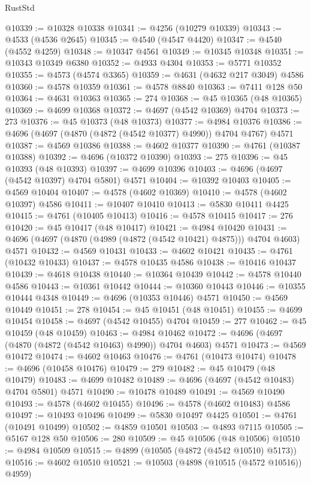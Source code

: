 \begin{lexlean}{RustStd}
\begin{coremodule}
@10339 := @10328 @10338
@10341 := @4256 (@10279 @10339)
@10343 := @4533 (@4536 @2645)
@10345 := @4540 (@4547 @4420)
@10347 := @4540 (@4552 @4259)
@10348 := @10347 @4561
@10349 := @10345 @10348
@10351 := @10343 @10349 @6380
@10352 := @4933 @4304
@10353 := @5771 @10352
@10355 := @4573 (@4574 @3365)
@10359 := @4631 (@4632 @217 @3049) @4586
@10360 := @4578 @10359
@10361 := @4578 @8840
@10363 := @7411 @128 @50
@10364 := @4631 @10363
@10365 := 274
@10368 := @45 @10365 (@48 @10365)
@10369 := @4699 @10368
@10372 := @4697 (@4542 @10369) @4704
@10373 := 273
@10376 := @45 @10373 (@48 @10373)
@10377 := @4984 @10376
@10386 := @4696 (@4697 (@4870 (@4872 (@4542 @10377) @4990)) @4704 @4767) @4571
@10387 := @4569 @10386
@10388 := @4602 @10377
@10390 := @4761 (@10387 @10388)
@10392 := @4696 (@10372 @10390)
@10393 := 275
@10396 := @45 @10393 (@48 @10393)
@10397 := @4699 @10396
@10403 := @4696 (@4697 (@4542 @10397) @4704 @5801) @4571
@10404 := @10392 @10403
@10405 := @4569 @10404
@10407 := @4578 (@4602 @10369)
@10410 := @4578 (@4602 @10397) @4586
@10411 := @10407 @10410
@10413 := @5830 @10411 @4425
@10415 := @4761 (@10405 @10413)
@10416 := @4578 @10415
@10417 := 276
@10420 := @45 @10417 (@48 @10417)
@10421 := @4984 @10420
@10431 := @4696 (@4697 (@4870 (@4989 (@4872 (@4542 @10421) @4875))) @4704 @4603) @4571
@10432 := @4569 @10431
@10433 := @4602 @10421
@10435 := @4761 (@10432 @10433)
@10437 := @4578 @10435 @4586
@10438 := @10416 @10437
@10439 := @4618 @10438
@10440 := @10364 @10439
@10442 := @4578 @10440 @4586
@10443 := @10361 @10442
@10444 := @10360 @10443
@10446 := @10355 @10444 @4348
@10449 := @4696 (@10353 @10446) @4571
@10450 := @4569 @10449
@10451 := 278
@10454 := @45 @10451 (@48 @10451)
@10455 := @4699 @10454
@10458 := @4697 (@4542 @10455) @4704
@10459 := 277
@10462 := @45 @10459 (@48 @10459)
@10463 := @4984 @10462
@10472 := @4696 (@4697 (@4870 (@4872 (@4542 @10463) @4990)) @4704 @4603) @4571
@10473 := @4569 @10472
@10474 := @4602 @10463
@10476 := @4761 (@10473 @10474)
@10478 := @4696 (@10458 @10476)
@10479 := 279
@10482 := @45 @10479 (@48 @10479)
@10483 := @4699 @10482
@10489 := @4696 (@4697 (@4542 @10483) @4704 @5801) @4571
@10490 := @10478 @10489
@10491 := @4569 @10490
@10493 := @4578 (@4602 @10455)
@10496 := @4578 (@4602 @10483) @4586
@10497 := @10493 @10496
@10499 := @5830 @10497 @4425
@10501 := @4761 (@10491 @10499)
@10502 := @4859 @10501
@10503 := @4893 @7115
@10505 := @5167 @128 @50
@10506 := 280
@10509 := @45 @10506 (@48 @10506)
@10510 := @4984 @10509
@10515 := @4899 (@10505 (@4872 (@4542 @10510) @5173))
@10516 := @4602 @10510
@10521 := @10503 (@4898 (@10515 (@4572 @10516)) @4959)

\end{coremodule}
\end{lexlean}
